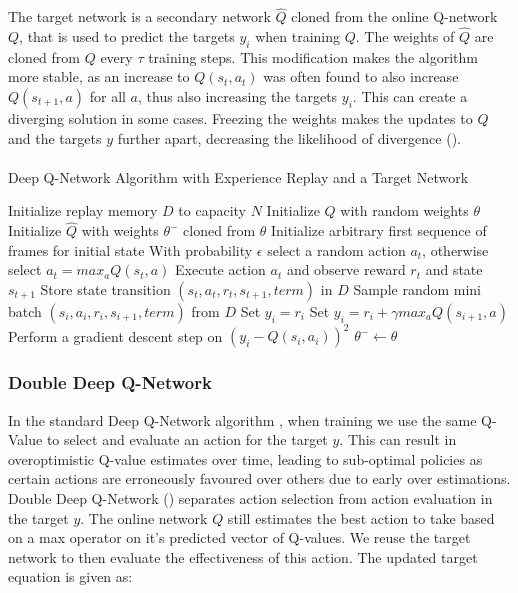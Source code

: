 The target network is a secondary network $\hat{Q}$ cloned from the online Q-network $Q$, that is used to predict the targets $y_i$ when training $Q$. The weights of $\hat{Q}$ are cloned from $Q$ every $\tau$ training steps. This modification makes the algorithm more stable, as an increase to $Q(s_t, a_t)$ was often found to also increase $Q(s_{t+1}, a)$ for all $a$, thus also increasing the targets $y_i$. This can create a diverging solution in some cases. Freezing the weights makes the updates to $Q$ and the targets $y$ further apart, decreasing the likelihood of divergence (\cite{human}). \paragraph{}

\begin{algorithm}
    \caption{Deep Q-Network Algorithm with Experience Replay and a Target Network}\label{alg:DQN}
    \begin{algorithmic}[1]
        \State Initialize replay memory $D$ to capacity $N$
        \State Initialize $Q$ with random weights $\theta$
        \State Initialize $\hat{Q}$ with weights $\theta^-$ cloned from $\theta$
        \State Initialize arbitrary first sequence of frames for initial state
        \State With probability $\epsilon$ select a random action $a_t$, otherwise select $a_t = max_a Q(s_t, a)$
        \State Execute action $a_t$ and observe reward $r_t$ and state $s_{t+1}$
        \State Store state transition $(s_t, a_t, r_t, s_{t+1}, term)$ in $D$
        \State Sample random mini batch $(s_i, a_i, r_i, s_{i + 1}, term)$ from $D$
        \State Set $y_i = r_i$
        \Else
        \State Set $y_i = r_i + \gamma max_a Q(s_{i+1}, a)$ \label{DQN:target}
        \EndIf
        \EndFor
        \State Perform a gradient descent step on $(y_i - Q(s_i, a_i))^2$
        $\theta^- \leftarrow \theta$
        \EndIf
        \EndFor
    \end{algorithmic}
\end{algorithm}

\subsubsection{Double Deep Q-Network}
In the standard Deep Q-Network algorithm , when training we use the same Q-Value to select and evaluate an action for the target $y$. This can result in overoptimistic Q-value estimates over time, leading to sub-optimal policies as certain actions are erroneously favoured over others due to early over estimations. Double Deep Q-Network (\cite{doubleq}) separates action selection from action evaluation in the target $y$. The online network $Q$ still estimates the best action to take based on a max operator on it's predicted vector of Q-values. We reuse the target network to then evaluate the effectiveness of this action. The updated target equation is given as:

